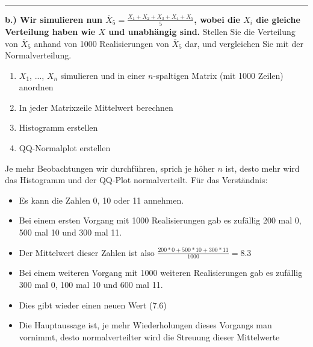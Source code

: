 \documentclass[11pt]{article}
\providecommand{\tightlist}{%
      \setlength{\itemsep}{0pt}\setlength{\parskip}{0pt}}
\begin{document}
    \begin{center}
    \end{center}
    { \hspace*{\fill} \\}
    
    \begin{center}\rule{0.5\linewidth}{\linethickness}\end{center}

\textbf{b.) Wir simulieren nun
\(\overline{X}_5 = \frac{X_1+X_2+X_3+X_4+X_5}{5}\), wobei die \(X_i\)
die gleiche Verteilung haben wie \(X\) und unabhängig sind.} Stellen Sie
die Verteilung von \(\overline{X}_5\) anhand von 1000 Realisierungen von
\(\overline{X}_5\) dar, und vergleichen Sie mit der Normalverteilung.

\begin{enumerate}
\def\labelenumi{\arabic{enumi}.}
\tightlist
\item
  \(X_1\), ..., \(X_n\) simulieren und in einer \(n\)-spaltigen Matrix
  (mit 1000 Zeilen) anordnen
\item
  In jeder Matrixzeile Mittelwert berechnen
\item
  Histogramm erstellen
\item
  QQ-Normalplot erstellen
\end{enumerate}

Je mehr Beobachtungen wir durchführen, sprich je höher \(n\) ist, desto
mehr wird das Histogramm und der QQ-Plot normalverteilt. Für das
Verständnis:

\begin{itemize}
\tightlist
\item
  Es kann die Zahlen 0, 10 oder 11 annehmen.
\item
  Bei einem ersten Vorgang mit 1000 Realisierungen gab es zufällig 200
  mal 0, 500 mal 10 und 300 mal 11.
\item
  Der Mittelwert dieser Zahlen ist also
  \(\frac{200*0 + 500*10 + 300*11}{1000} = 8.3\)
\item
  Bei einem weiteren Vorgang mit 1000 weiteren Realisierungen gab es
  zufällig 300 mal 0, 100 mal 10 und 600 mal 11.
\item
  Dies gibt wieder einen neuen Wert (7.6)
\item
  Die Hauptaussage ist, je mehr Wiederholungen dieses Vorgangs man
  vornimmt, desto normalverteilter wird die Streuung dieser Mittelwerte
\end{itemize}
\end{document}
